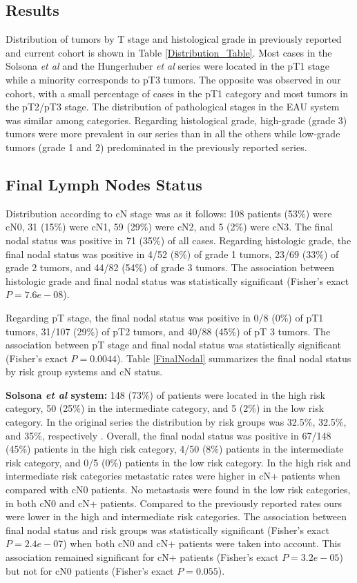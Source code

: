\documentclass[11pt,letterpaper]{article}\usepackage[]{graphicx}\usepackage[]{color}
\begin{document}
\begin{multicols}{2}
\section*{Results}
Distribution of tumors by T stage and histological grade in previously reported and current cohort is shown in Table \ref{Distribution_Table}. Most cases in the Solsona \emph{et al} and the Hungerhuber \emph{et al} series were located in the pT1 stage while a minority corresponds to pT3 tumors. The opposite was observed in our cohort, with a small percentage of cases in the pT1 category and most tumors in the pT2/pT3 stage. The distribution of pathological stages in the EAU system was similar among categories. Regarding histological grade, high-grade (grade 3) tumors were more prevalent in our series than in all the others while low-grade tumors (grade 1 and 2) predominated in the previously reported series.

\subsection*{Final Lymph Nodes Status}
Distribution according to cN stage was as it follows: 108 patients (53\%) were cN0, 31 (15\%) were cN1, 59 (29\%) were cN2, and 5 (2\%) were cN3. The final nodal status was positive in 71 (35\%) of all cases. Regarding histologic grade, the final nodal status was positive in 4/52 (8\%) of grade 1 tumors, 23/69 (33\%) of grade 2 tumors, and 44/82 (54\%) of grade 3 tumors. The association between histologic grade and final nodal status was statistically significant (Fisher's exact $P=7.6e-08$).

Regarding pT stage, the final nodal status was positive in 0/8 (0\%) of pT1 tumors, 31/107 (29\%) of pT2 tumors, and 40/88 (45\%) of pT 3 tumors. The association between pT stage and final nodal status was statistically significant (Fisher's exact $P=0.0044$). Table \ref{FinalNodal} summarizes the final nodal status by risk group systems and cN status.

\textbf{Solsona \emph{et al} system:} 148 (73\%) of patients were located in the high risk category, 50 (25\%) in the intermediate category, and 5 (2\%) in the low risk category. In the original series the distribution by risk groups was 32.5\%, 32.5\%, and 35\%, respectively \cite{Solsona2001}. Overall, the final nodal status was positive in 67/148 (45\%) patients in the high risk category, 4/50 (8\%) patients in the intermediate risk category, and 0/5 (0\%) patients in the low risk category. In the high risk and intermediate risk categories metastatic rates were higher in cN+ patients when compared with cN0 patients. No metastasis were found in the low risk categories, in both cN0 and cN+ patients. Compared to the previously reported rates ours were lower in the high and intermediate risk categories. The association between final nodal status and risk groups was statistically significant (Fisher's exact $P=2.4e-07$) when both cN0 and cN+ patients were taken into account. This association remained significant for cN+ patients (Fisher's exact $P=3.2e-05$) but not for cN0 patients (Fisher's exact $P=0.055$).


\end{multicols}
\end{document}
